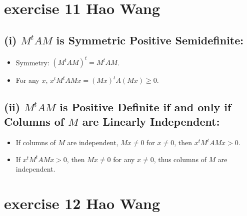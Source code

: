 \documentclass{article}
\begin{document}
\section{exercise 11 Hao Wang}

\subsection*{(i) \(M^t A M\) is Symmetric Positive Semidefinite:}

\begin{itemize}
    \item Symmetry: \((M^t A M)^t = M^t A M\).
    \item For any \(x\), \(x^t M^t A M x = (Mx)^t A (M x) \geq 0\).
\end{itemize}

\subsection*{(ii) \(M^t A M\) is Positive Definite if and only if Columns of \(M\) are Linearly Independent:}

\begin{itemize}
    \item If columns of \(M\) are independent, \(M x \neq 0\)  for \(x \neq 0\), then \(x^t M^t A M x > 0\).
    \item If \(x^t M^t A M x > 0\), then \(M x \neq 0\) for any \(x \neq 0\), thus columns of \(M\) are independent.
\end{itemize}

\section{exercise 12 Hao Wang}
\end{document}
